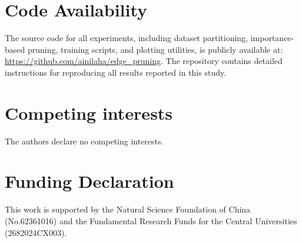\documentclass[journal,twoside]{IEEEtran}
\begin{document}
\section{Code Availability}

The source code for all experiments, including dataset partitioning, importance-based pruning, training scripts, and plotting utilities, is publicly available at: \url{https://github.com/ainilaha/edge\_pruning}. The repository contains detailed instructions for reproducing all results reported in this study.




\section*{Competing interests}
The authors declare no competing interests.

\section*{Funding Declaration}
This work is supported by the Natural Science Foundation of China (No.62361016) and the Fundamental Research Funds for the Central Universities (2682024CX003).



\end{document}
